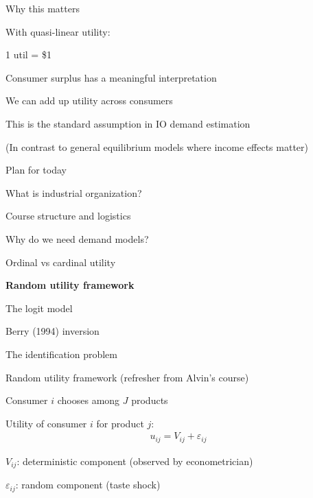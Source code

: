 \documentclass[notes,11pt, aspectratio=169]{beamer}
\newenvironment{wideitemize}{\itemize\addtolength{\itemsep}{10pt}}{\enditemize}
\newenvironment{wideenumerate}{\enumerate\addtolength{\itemsep}{10pt}}{\endenumerate}
\begin{document}
\begin{frame}{Why this matters}
	\begin{wideitemize}
		\item With quasi-linear utility:
		\begin{wideitemize}
			\vspace{5pt}
			\item 1 util = \$1
			\item Consumer surplus has a meaningful interpretation
			\item We can add up utility across consumers
		\end{wideitemize}
		\item This is the standard assumption in IO demand estimation
		\item (In contrast to general equilibrium models where income effects matter)
	\end{wideitemize}
\end{frame}

\begin{frame}{Plan for today}
  \begin{wideenumerate}
    \item What is industrial organization?
    \item Course structure and logistics
    \item Why do we need demand models?
    \item Ordinal vs cardinal utility
    \item \textbf{Random utility framework}
    \item The logit model
    \item Berry (1994) inversion
    \item The identification problem
  \end{wideenumerate}
\end{frame}

\begin{frame}{Random utility framework (refresher from Alvin's course)}
	\begin{wideitemize}
		\item Consumer $i$ chooses among $J$ products
		\item Utility of consumer $i$ for product $j$:
		\begin{align*}
			u_{ij} = V_{ij} + \varepsilon_{ij}
		\end{align*}
		\item $V_{ij}$: deterministic component (observed by econometrician)
		\item $\varepsilon_{ij}$: random component (taste shock)
	\end{wideitemize}
\end{frame}
\end{document}

